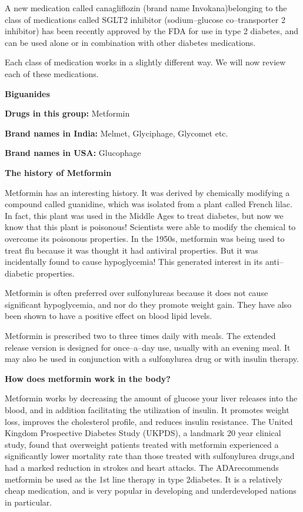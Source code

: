 A new medication called canagliflozin (brand name Invokana)\break belonging to the class of medications called SGLT2 inhibitor (sodium–glucose co–transporter 2 inhibitor) has been recently approved by the FDA for use in type 2 diabetes, and can be used alone or in combination with other diabetes medications.

Each class of medication works in a slightly different way. We will now review each of these medications.

\vskip 6pt

\textbf{Biguanides}

\textbf{Drugs in this group:} Metformin

\textbf{Brand names in India:} Melmet, Glyciphage, Glycomet etc.

\textbf{Brand names in USA:} Glucophage

\noindent\textbf{The history of Metformin}

Metformin has an interesting history. It was derived by chemi\-cally modifying a compound called guanidine, which was isolated from a plant called French lilac. In fact, this plant was used in the Middle Ages to treat diabetes, but now we know that this plant is poiso\-nous! Scie\-ntists were able to modify the chemical to overcome its poisonous properties. In the 1950s, metformin was being used to treat flu because it was thought it had antiviral properties. But it was inci\-de\-ntally found to cause hypoglycemia! This generated interest in its anti–diabetic properties.

Metformin is often preferred over sulfonylureas because it does not cause significant hypoglycemia, and nor do they promote weight gain. They have also been shown to have a positive effect on blood lipid levels.

Metformin is prescribed two to three times daily with meals. The extended release version is designed for once–a–day use, usually with an evening meal. It may also be used in conjunction with a sulfonylurea drug or with insulin therapy.

\noindent\textbf{How does metformin work in the body?}

Metformin works by decreasing the amount of glucose your liver releases into the blood, and in addition facilitating the utilization of insulin. It promotes weight loss, improves the cholesterol profile, and reduces insulin resistance. The United Kingdom Prospective Diabetes Study (UKPDS), a landmark 20 year clinical study, found that overweight patients treated with metformin experienced a significantly lower mortality rate than those treated with sulfonylurea drugs,\break and had a marked reduction in strokes and heart attacks. The ADA\break recommends metformin be used as the 1st line therapy in type 2\break diabetes. It is a relatively cheap medication, and is very popular in developing and underdeveloped nations in particular.

